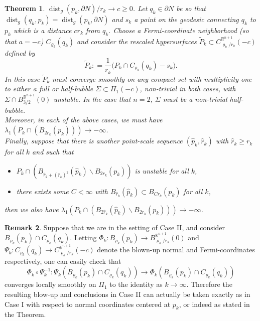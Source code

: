 \documentclass[10pt]{article}
\newtheorem{thm}{Theorem}
\theoremstyle{definition}\newtheorem{definition}[thm]{Definition}
\newtheorem{rmk}[thm]{Remark}
\numberwithin{equation}{section}
\newcommand{\R}{\mathbb{R}}\newcommand{\C}{\mathbb{C}}\newcommand{\N}{\mathbb{N}}
\begin{document}
\begin{thm}
        	 		 $\operatorname{dist}_g(p_k,\partial N)/r_k\to c\geqslant 0$. Let $q_k\in\partial N$ be so that $\operatorname{dist}_g(q_k,p_k)=\operatorname{dist}_g(p_k,\partial N)$ and $s_k$ a point on the geodesic connecting $q_k$ to $p_k$ which is a distance $cr_k$ from $q_k$. Choose a Fermi-coordinate neighborhood (so that $a=-c$) $C_{\varrho_k}(q_k)$ and consider the rescaled hypersurfaces $\widetilde{P}_k \subset C^{\R^{n+1}}_{\varrho_k/r_k}(-c)$ defined by
        	 		\begin{equation*}
        	 		\widetilde{P}_k  : = \frac{1}{r_k} \big(P_k\cap C_{\varrho_k}(q_k)- s_k\big).
        	 		\end{equation*}   In this case $\widetilde{P}_k$ must converge smoothly on any compact set with multiplicity one to \emph{either a full or half-bubble} $\Sigma\subset \Pi_1(-c)$, non-trivial in both cases, with $\Sigma\cap B^{\R^{n+1}}_{3/2}(0)$ unstable. %
        	 		In the case that $n=2$, $\Sigma$ must be a non-trivial half-bubble. \\ 	
        	 		Moreover, in each of the above cases, we must have $\lambda_1(P_k \cap (B_{2r_k}(p_k)))\to -\infty$. \\
        	 		
        	 		
        	 		Finally, suppose that there is another point-scale sequence $(\widehat{p}_k, \widehat{r}_k)$ with $\widehat{r}_k \geqslant r_k$ for all $k$ and such that
        	 		\begin{itemize}
        	 			\item $P_k\cap (B_{\widehat{r}_k+ (\widehat{r}_k)^2}(\widehat{p}_k)\smallsetminus B_{2r_k}(p_k))$ is unstable for all $k$,
        	 			\item there exists some $C<\infty$ with $B_{\widehat{r}_k}(\widehat{p}_k)\subset B_{Cr_k}(p_k)$ for all $k$,
        	 		\end{itemize}
        	 		then we also have $\lambda_1(P_k\cap (B_{2\widehat{r}_k}(\widehat{p}_k)\smallsetminus B_{2r_k}(p_k))) \to -\infty$.
        	 	\end{thm}
        	 	
        	 	\begin{rmk}\label{rmk:coord}
        	 		Suppose that we are in the setting of Case II, and consider $B_{\varrho_k}(p_k)\cap C_{\varrho_k}(q_k)$. Letting $\Phi_k : B_{\varrho_k}(p_k) \to B^{\R^{n+1}}_{\varrho_k/r_k}(0)$ and $\Psi_k : C_{\varrho_k}(q_k)\to C^{\R^{n+1}}_{\varrho_k/r_k}(-c)$ denote the blown-up normal and Fermi-coordinates respectively, one can easily check that 
        	 		$$\Phi_k\circ \Psi_k^{-1}:  \Psi_k(B_{\varrho_k}(p_k)\cap C_{\varrho_k}(q_k)) \longrightarrow \Phi_k(B_{\varrho_k}(p_k)\cap C_{\varrho_k}(q_k))$$
        	 		converges locally smoothly on $\Pi_1$ to the identity as $k\to \infty$. Therefore the resulting blow-up and conclusions in Case II can actually be taken exactly as in Case I with respect to normal coordinates centered at $p_k$, or indeed as stated in the Theorem. 
        	 	\end{rmk}
        	 	
\end{document}
